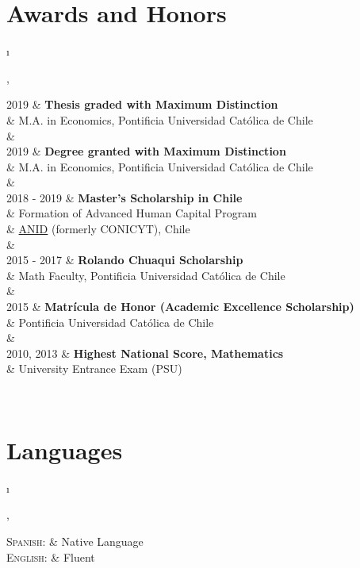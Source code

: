 \documentclass[a4paper, margins=2cm,10pt]{article}
\newcommand{\tablength}{}
\newcommand{\setTabParams}[1]{\renewcommand\tablength{}\forcsvlist{\listadd\tablength}{#1}}
\newcommand{\setCols}[1]{			%
	\ifnum0=\i						%
		\ifdim0cm=#1				%
			\def \firstCol {r}		%
		\else						%
			\def \firstCol {p{#1}}		%
		\fi						%
	\else \ifnum1=\i				%
		\ifdim0cm=#1				%
			\def \secondCol {l}		%
		\else						%
			\def \secondCol{p{#1}}	%
		\fi						%
	\else \ifnum2=\i				%
		\ifnum0=#1				%
			\def \sep {}			%
		\else						%
			\def \sep {|}			%
		\fi						%
	\fi \fi \fi						%
	\advance\i by1					%
}
\newcommand{\tab}[1]{					%
	\newcount\i						%
	\forlistloop{\setCols}{\tablength}		%
	\begin{tabular}{\firstCol \sep \secondCol}	%
		#1							%
	\end{tabular} \\						%
}
\begin{document}
\section{Awards and Honors}
\setTabParams{0cm,11cm,0}

\tab{
\textsc{2019}
	&	\textbf{Thesis graded with Maximum Distinction}				\\[0.2ex]
	&	M.A. in Economics, Pontificia Universidad Católica de Chile		\\
	&	\\

\textsc{2019}
	&	\textbf{Degree granted with Maximum Distinction}			\\[0.2ex]
	&	M.A. in Economics, Pontificia Universidad Católica de Chile		\\
	&	\\

\textsc{2018 - 2019} 
	&	\textbf{Master's Scholarship in Chile}						\\[0.2ex]
	&	Formation of Advanced Human Capital Program				\\[0.2ex]
	&	\href{https://www.anid.cl}{ANID} (formerly CONICYT), Chile		\\
	&	\\

\textsc{2015 - 2017} 
	&	\textbf{Rolando Chuaqui Scholarship}						\\[0.2ex]
	&	Math Faculty, Pontificia Universidad Católica de Chile			\\
	&	\\
	
\textsc{2015}
	&	\textbf{Matrícula de Honor (Academic Excellence Scholarship)}	\\[0.2ex]
	&	Pontificia Universidad Católica de Chile						\\
	&	\\

\textsc{2010, 2013}
	&	\textbf{Highest National Score, Mathematics}				\\[0.2ex]
	&	 University Entrance Exam (PSU)							\\	
}

\section{Languages}
\setTabParams{0cm,0cm,0}

\tab{
\textsc{Spanish:}
	&	Native Language	\\

\textsc{English:}
	&	Fluent	\\
}
\end{document}
